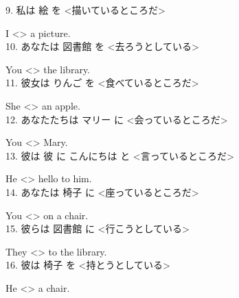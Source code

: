 \documentclass[uplatex,
paper=a4,
fontsize=18pt,
jafontsize=16pt,
number_of_lines=30,
line_length=30zh,
baselineskip=25pt,
]{jlreq}
\begin{document}
9.  私は 絵 を <描いているところだ>

  I <\hspace{3em}\hspace{3em}\hspace{2em}> a picture.
\\

10.  あなたは 図書館 を <去ろうとしている>

  You <\hspace{3em}\hspace{3em}\hspace{2em}> the library.
\\

11.  彼女は りんご を <食べているところだ>

  She <\hspace{3em}\hspace{3em}\hspace{2em}> an apple.
\\

12.  あなたたちは マリー に <会っているところだ>

  You <\hspace{3em}\hspace{3em}\hspace{2em}> Mary.
\\

13.  彼は 彼 に こんにちは と <言っているところだ>

  He <\hspace{3em}\hspace{3em}\hspace{2em}> hello to him.
\\

14.  あなたは 椅子 に <座っているところだ>

  You <\hspace{3em}\hspace{3em}\hspace{2em}> on a chair.
\\

15.  彼らは 図書館 に <行こうとしている>

  They <\hspace{3em}\hspace{3em}\hspace{2em}> to the library.
\\

16.  彼は 椅子 を <持とうとしている>

  He <\hspace{3em}\hspace{3em}\hspace{2em}> a chair.
\\
\end{document}
